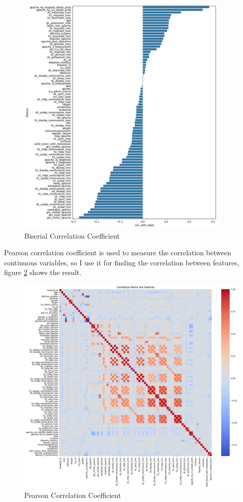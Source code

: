 \documentclass[a4paper, oneside, final, 12pt]{scrartcl} %
\begin{document}
\begin{figure}[h]
  \centering
  \includegraphics[width=0.9\textwidth]{"./image/biserial_corr.png"}
  \caption{Biserial Correlation Coefficient}
  \label{fig:biserial_correlation}
\end{figure}

Pearson correlation coefficient is used to measure the correlation between continuous variables,
so I use it for finding the correlation between features, figure \ref{fig:pearson_correlation} shows the result.

\begin{figure}[h]
  \centering
  \includegraphics[width=1.0\textwidth]{"./image/feature_corr.png"}
  \caption{Pearson Correlation Coefficient}
  \label{fig:pearson_correlation}
\end{figure}
\end{document}
